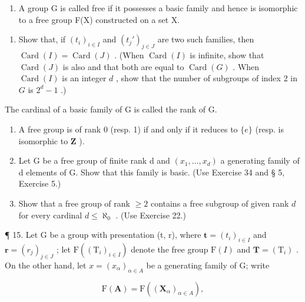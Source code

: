 \begin{enumerate}
\def\labelenumi{\arabic{enumi}.}
\setcounter{enumi}{13}
\tightlist
\item
  A group G is called free if it possesses a basic family and hence is isomorphic to a free group F(X) constructed on a set X.
\end{enumerate}

\begin{enumerate}
\def\labelenumi{(\alph{enumi})}
\tightlist
\item
  Show that, if \((t_i)_{i\in I}\) and \((t_j')_{j\in J}\) are two such families, then \(\operatorname{Card}(I) = \operatorname{Card}(J)\) . (When \(\operatorname{Card}(I)\) is infinite, show that \(\operatorname{Card}(J)\) is also and that both are equal to \(\operatorname{Card}(G)\) . When \(\operatorname{Card}(I)\) is an integer \(d\) , show that the number of subgroups of index 2 in \(G\) is \(2^d - 1\) .)
\end{enumerate}

The cardinal of a basic family of G is called the rank of G.

\begin{enumerate}
\def\labelenumi{(\alph{enumi})}
\setcounter{enumi}{1}
\item
  A free group is of rank 0 (resp. 1) if and only if it reduces to \(\{e\}\) (resp. is isomorphic to \(\mathbf{Z}\) ).
\item
  Let G be a free group of finite rank d and \((x_{1},\ldots,x_{d})\) a generating family of d elements of G. Show that this family is basic. (Use Exercise 34 and § 5, Exercise 5.)
\item
  Show that a free group of rank \(\geqslant 2\) contains a free subgroup of given rank \(d\) for every cardinal \(d \leqslant \aleph_0\) . (Use Exercise 22.)
\end{enumerate}

¶ 15. Let G be a group with presentation (t, r), where \(\mathbf{t} = (t_{i})_{i \in I}\) and \(\mathbf{r} = (r_{j})_{j \in J}\) ; let \(\mathrm{F}((\mathrm{T}_{i})_{i \in I})\) denote the free group \(\mathrm{F}(I)\) and \(\mathbf{T} = (\mathrm{T}_{i})\) . On the other hand, let \(x = (x_{\alpha})_{\alpha \in A}\) be a generating family of G; write

\[
\mathrm{F} (\mathbf {A}) = \mathrm{F} ((\mathbf {X} _ {\alpha}) _ {\alpha \in A}),
\]

